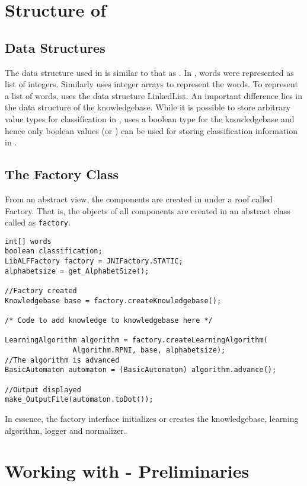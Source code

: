 \section{Structure of \jalf}

\subsection*{Data Structures}
The data structure used in \jalf is similar to that as \libalf.  In \libalf, words were represented as list of integers. Similarly \jalf uses integer arrays to represent the words. To represent a list of words, \jalf uses the data structure LinkedList.
An important difference lies in the data structure of the knowledgebase. While it is possible to store arbitrary value types for classification in \libalf, \jalf uses a boolean type for the knowledgebase and hence only boolean values (\true or \false) can be used for storing classification information in \jalf. 

\subsection*{The Factory Class}
From an abstract view, the components are created in \jalf under a roof called Factory. That is, the objects of all components are created in an abstract class called as \texttt{factory}. 

\begin{lstlisting}
int[] words
boolean classification;
LibALFFactory factory = JNIFactory.STATIC;
alphabetsize = get_AlphabetSize();

//Factory created
Knowledgebase base = factory.createKnowledgebase();

/* Code to add knowledge to knowledgebase here */

LearningAlgorithm algorithm = factory.createLearningAlgorithm(
				Algorithm.RPNI, base, alphabetsize);
//The algorithm is advanced
BasicAutomaton automaton = (BasicAutomaton) algorithm.advance();

//Output displayed
make_OutputFile(automaton.toDot());

\end{lstlisting}






In essence, the factory interface initializes or creates the knowledgebase, learning algorithm, logger and normalizer.

\section{Working with \jalf - Preliminaries}

